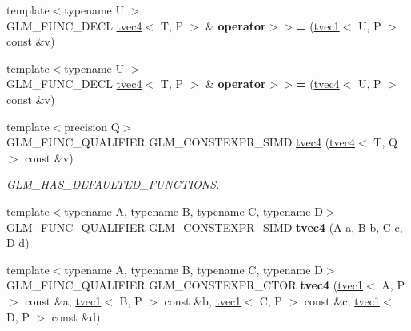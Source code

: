 \begin{DoxyCompactItemize}
{\footnotesize template$<$typename U $>$ }\\G\+L\+M\+\_\+\+F\+U\+N\+C\+\_\+\+D\+E\+CL \hyperlink{structglm_1_1tvec4}{tvec4}$<$ T, P $>$ \& {\bfseries operator$>$$>$=} (\hyperlink{structglm_1_1tvec1}{tvec1}$<$ U, P $>$ const \&v)
\item 
\mbox{\label{structglm_1_1tvec4_a36837fd895234f73e2e76aedb39712b2}} 
{\footnotesize template$<$typename U $>$ }\\G\+L\+M\+\_\+\+F\+U\+N\+C\+\_\+\+D\+E\+CL \hyperlink{structglm_1_1tvec4}{tvec4}$<$ T, P $>$ \& {\bfseries operator$>$$>$=} (\hyperlink{structglm_1_1tvec4}{tvec4}$<$ U, P $>$ const \&v)
\item 
\mbox{\label{structglm_1_1tvec4_a9e9e0e3167fcd351433d379fa90c16bd}} 
{\footnotesize template$<$precision Q$>$ }\\G\+L\+M\+\_\+\+F\+U\+N\+C\+\_\+\+Q\+U\+A\+L\+I\+F\+I\+ER G\+L\+M\+\_\+\+C\+O\+N\+S\+T\+E\+X\+P\+R\+\_\+\+S\+I\+MD \hyperlink{structglm_1_1tvec4_a9e9e0e3167fcd351433d379fa90c16bd}{tvec4} (\hyperlink{structglm_1_1tvec4}{tvec4}$<$ T, Q $>$ const \&v)
\begin{DoxyCompactList}\small\item\em G\+L\+M\+\_\+\+H\+A\+S\+\_\+\+D\+E\+F\+A\+U\+L\+T\+E\+D\+\_\+\+F\+U\+N\+C\+T\+I\+O\+NS. \end{DoxyCompactList}\item 
\mbox{\label{structglm_1_1tvec4_ab8f77251d80df00048516ad6a8d16ba5}} 
{\footnotesize template$<$typename A, typename B, typename C, typename D$>$ }\\G\+L\+M\+\_\+\+F\+U\+N\+C\+\_\+\+Q\+U\+A\+L\+I\+F\+I\+ER G\+L\+M\+\_\+\+C\+O\+N\+S\+T\+E\+X\+P\+R\+\_\+\+S\+I\+MD {\bfseries tvec4} (A a, B b, C c, D d)
\item 
\mbox{\label{structglm_1_1tvec4_a77748f70d885075262c53edf498cfb7a}} 
{\footnotesize template$<$typename A, typename B, typename C, typename D$>$ }\\G\+L\+M\+\_\+\+F\+U\+N\+C\+\_\+\+Q\+U\+A\+L\+I\+F\+I\+ER G\+L\+M\+\_\+\+C\+O\+N\+S\+T\+E\+X\+P\+R\+\_\+\+C\+T\+OR {\bfseries tvec4} (\hyperlink{structglm_1_1tvec1}{tvec1}$<$ A, P $>$ const \&a, \hyperlink{structglm_1_1tvec1}{tvec1}$<$ B, P $>$ const \&b, \hyperlink{structglm_1_1tvec1}{tvec1}$<$ C, P $>$ const \&c, \hyperlink{structglm_1_1tvec1}{tvec1}$<$ D, P $>$ const \&d)

\end{DoxyCompactItemize}
